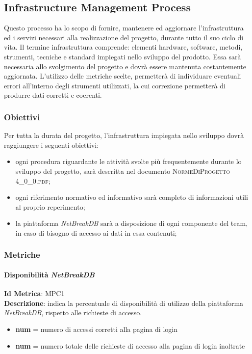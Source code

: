 	\subsection{Infrastructure Management Process}
	Questo processo ha lo scopo di fornire, mantenere ed aggiornare l’infrastruttura ed i servizi necessari alla realizzazione del progetto, durante tutto il suo ciclo di vita. Il termine infrastruttura comprende: elementi hardware, software, metodi, strumenti, tecniche e standard impiegati nello sviluppo del prodotto.
	Essa sarà necessaria allo svolgimento del progetto e dovrà essere mantenuta costantemente aggiornata.
	L'utilizzo delle metriche scelte, permetterà di individuare eventuali errori all’interno degli strumenti utilizzati, la cui correzione permetterà di produrre dati corretti e coerenti.
		
		\subsubsection{Obiettivi}
		Per tutta la durata del progetto, l’infrastruttura impiegata nello sviluppo dovrà raggiungere i seguenti obiettivi:
		\begin{itemize}
			\item ogni procedura riguardante le attività svolte più frequentemente durante lo sviluppo del
			progetto, sarà descritta nel documento \textsc{NormeDiProgetto 4\_0\_0.pdf};
			\item ogni riferimento normativo ed informativo sarà completo di informazioni utili al proprio
			reperimento;
			\item la piattaforma \textit{NetBreakDB} sarà a disposizione di ogni componente del team, in caso di bisogno di accesso ai dati in essa contenuti;
		\end{itemize}
		\subsubsection{Metriche}
			\paragraph{Disponibilità \textit{NetBreakDB}}
			\textbf{Id Metrica}: \hypertarget{MPC1}{MPC1}\\
			\textbf{Descrizione}: indica la percentuale di disponibilità di utilizzo della piattaforma \textit{NetBreakDB}, rispetto alle richieste di accesso.
			
			\begin{itemize}
				\item \textbf{num} = numero di accessi corretti alla pagina di login
				\item \textbf{num} = numero totale delle richieste di accesso alla pagina di login inoltrate
			\end{itemize}
			
